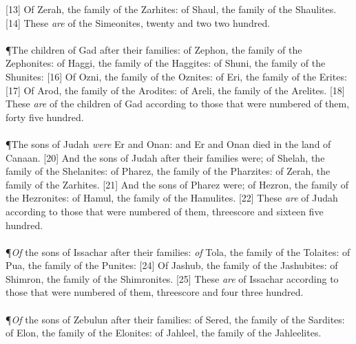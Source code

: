 [13] \textcolor[cmyk]{0.99998,1,0,0}{Of Zerah, the family of the Zarhites: of Shaul, the family of the Shaulites.}
[14] \textcolor[cmyk]{0.99998,1,0,0}{These \emph{are}  of the Simeonites, twenty and two  two hundred.}\\
\\
\P \textcolor[cmyk]{0.99998,1,0,0}{The children of Gad after their families: of Zephon, the family of the Zephonites: of Haggi, the family of the Haggites: of Shuni, the family of the Shunites:}
[16] \textcolor[cmyk]{0.99998,1,0,0}{Of Ozni, the family of the Oznites: of Eri, the family of the Erites:}
[17] \textcolor[cmyk]{0.99998,1,0,0}{Of Arod, the family of the Arodites: of Areli, the family of the Arelites.}
[18] \textcolor[cmyk]{0.99998,1,0,0}{These \emph{are}  of the children of Gad according to those that were numbered of them, forty  five hundred.}\\
\\
\P \textcolor[cmyk]{0.99998,1,0,0}{The sons of Judah \emph{were} Er and Onan: and Er and Onan died in the land of Canaan.}
[20] \textcolor[cmyk]{0.99998,1,0,0}{And the sons of Judah after their families were; of Shelah, the family of the Shelanites: of Pharez, the family of the Pharzites: of Zerah, the family of the Zarhites.}
[21] \textcolor[cmyk]{0.99998,1,0,0}{And the sons of Pharez were; of Hezron, the family of the Hezronites: of Hamul, the family of the Hamulites.}
[22] \textcolor[cmyk]{0.99998,1,0,0}{These \emph{are}  of Judah according to those that were numbered of them, threescore and sixteen  five hundred.}\\
\\
\P \textcolor[cmyk]{0.99998,1,0,0}{\emph{Of} the sons of Issachar after their families: \emph{of} Tola, the family of the Tolaites: of Pua, the family of the Punites:}
[24] \textcolor[cmyk]{0.99998,1,0,0}{Of Jashub, the family of the Jashubites: of Shimron, the family of the Shimronites.}
[25] \textcolor[cmyk]{0.99998,1,0,0}{These \emph{are}  of Issachar according to those that were numbered of them, threescore and four  three hundred.}\\
\\
\P \textcolor[cmyk]{0.99998,1,0,0}{\emph{Of} the sons of Zebulun after their families: of Sered, the family of the Sardites: of Elon, the family of the Elonites: of Jahleel, the family of the Jahleelites.}
